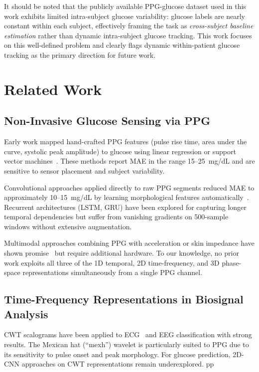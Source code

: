 \documentclass[conference]{IEEEtran}
\begin{document}
It should be noted that the publicly available PPG-glucose dataset used in this
work exhibits limited intra-subject glucose variability: glucose labels are
nearly constant within each subject, effectively framing the task as
\emph{cross-subject baseline estimation} rather than dynamic intra-subject
glucose tracking.
This work focuses on this well-defined problem and clearly flags dynamic
within-patient glucose tracking as the primary direction for future work.

\section{Related Work}
\label{sec:related}

\subsection{Non-Invasive Glucose Sensing via PPG}
Early work mapped hand-crafted PPG features (pulse rise time, area under the
curve, systolic peak amplitude) to glucose using linear regression or support
vector machines~\cite{hina2021noninvasive}.  These methods report MAE in the
range 15--25~mg/dL and are sensitive to sensor placement and subject variability.

Convolutional approaches applied directly to raw PPG segments reduced MAE to
approximately 10--15~mg/dL by learning morphological features
automatically~\cite{dinh2022ppg}.  Recurrent architectures (LSTM, GRU) have
been explored for capturing longer temporal dependencies but suffer from vanishing
gradients on 500-sample windows without extensive augmentation.

Multimodal approaches combining PPG with acceleration or skin impedance have
shown promise~\cite{almarshad2021} but require additional hardware.  To our
knowledge, no prior work exploits all three of the 1D temporal, 2D
time-frequency, and 3D phase-space representations simultaneously from a single
PPG channel.

\subsection{Time-Frequency Representations in Biosignal Analysis}
CWT scalograms have been applied to ECG~\cite{li2020ecg} and EEG classification
with strong results.  The Mexican hat (``mexh'') wavelet is particularly suited
to PPG due to its sensitivity to pulse onset and peak morphology.  For glucose
prediction, 2D-CNN approaches on CWT representations remain underexplored.
pp
\end{document}
